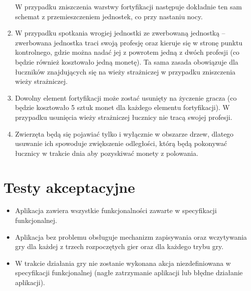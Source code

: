 \documentclass[12pt, a4paper]{article}
\begin{document}
\begin{enumerate}
W przypadku zniszczenia warstwy fortyfikacji następuje dokładnie ten sam 
schemat z przemieszczeniem jednostek, co przy nastaniu nocy.
\item W przypadku spotkania wrogiej jednostki ze zwerbowaną jednostką -- 
zwerbowana jednostka traci swoją profesję oraz kieruje się w stronę punktu 
kontrolnego, gdzie można nadać jej z powrotem jedną z dwóch profesji (co 
będzie również kosztowało jedną monetę). Ta sama zasada obowiązuje dla 
łuczników znajdujących się na wieży strażniczej w przypadku zniszczenia wieży 
strażniczej.
\item Dowolny element fortyfikacji może zostać usunięty na życzenie gracza 
(co będzie kosztowało 5 sztuk monet dla każdego elementu fortyfikacji). W 
przypadku usunięcia wieży strażniczej łucznicy nie tracą swojej profesji.
\item Zwierzęta będą się pojawiać tylko i wyłącznie w obszarze drzew, dlatego 
usuwanie ich spowoduje zwiększenie odległości, którą będą pokonywać łucznicy 
w trakcie dnia aby pozyskiwać monety z polowania.
\end{enumerate}

\section{Testy akceptacyjne}
\begin{itemize}
\item Aplikacja zawiera wszystkie funkcjonalności zawarte w specyfikacji 
funkcjonalnej.
\item Aplikacja bez problemu obsługuje mechanizm zapisywania oraz wczytywania 
gry dla każdej z trzech rozpoczętych gier oraz dla każdego trybu gry.
\item W trakcie działania gry nie zostanie wykonana akcja niezdefiniowana w 
specyfikacji funkcjonalnej (nagłe zatrzymanie aplikacji lub błędne działanie 
aplikacji).
\end{itemize}
\end{document}
